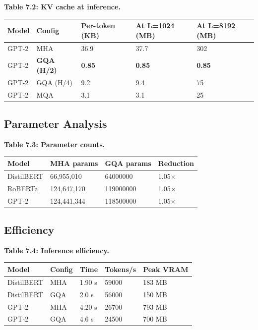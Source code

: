 \textbf{Table 7.2: KV cache at inference.}

\begin{table}[H]
\centering
\small
\begin{tabular}{lllll}
\toprule
\textbf{Model} & \textbf{Config} & \textbf{Per-token (KB)} & \textbf{At L=1024 (MB)} & \textbf{At L=8192 (MB)} \\
\midrule
GPT-2 & MHA & 36.9 & 37.7 & 302 \\
GPT-2 & \textbf{GQA (H/2)} & \textbf{0.85} & \textbf{0.85} & \textbf{0.85} \\
GPT-2 & GQA (H/4) & 9.2 & 9.4 & 75 \\
GPT-2 & MQA & 3.1 & 3.1 & 25 \\
\bottomrule
\end{tabular}
\end{table}

\subsection{Parameter Analysis}

\textbf{Table 7.3: Parameter counts.}

\begin{table}[H]
\centering
\small
\begin{tabular}{llll}
\toprule
\textbf{Model} & \textbf{MHA params} & \textbf{GQA params} & \textbf{Reduction} \\
\midrule
DistilBERT & 66,955,010 & 64000000 & 1.05$\times$ \\
RoBERTa & 124,647,170 & 119000000 & 1.05$\times$ \\
GPT-2 & 124,441,344 & 118500000 & 1.05$\times$ \\
\bottomrule
\end{tabular}
\end{table}

\subsection{Efficiency}

\textbf{Table 7.4: Inference efficiency.}

\begin{table}[H]
\centering
\small
\begin{tabular}{lllll}
\toprule
\textbf{Model} & \textbf{Config} & \textbf{Time} & \textbf{Tokens/s} & \textbf{Peak VRAM} \\
\midrule
DistilBERT & MHA & 1.90 s & 59000 & 183 MB \\
DistilBERT & GQA & 2.0 s & 56000 & 150 MB \\
GPT-2 & MHA & 4.20 s & 26700 & 793 MB \\
GPT-2 & GQA & 4.6 s & 24500 & 700 MB \\
\bottomrule
\end{tabular}
\end{table}

